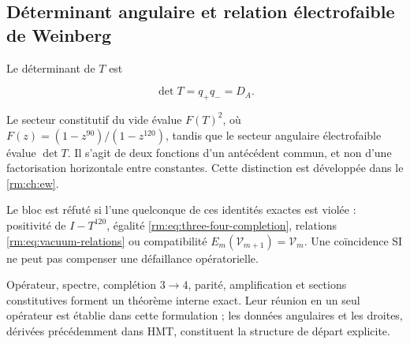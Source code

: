 \subsection{Déterminant angulaire et relation électrofaible de Weinberg}

Le déterminant de \(T\) est

\begin{equation}
\det T=q_+q_-=D_A.
\label{rm:eq:detT}
\end{equation}

Le secteur constitutif du vide évalue \(F(T)^2\), où
\(F(z)=(1-z^{90})/(1-z^{120})\), tandis que le secteur angulaire
électrofaible évalue \(\det T\). Il s'agit de deux fonctions d'un
antécédent commun, et non d'une factorisation horizontale entre constantes.
Cette distinction est développée dans le \cref{rm:ch:ew}.

\begin{falsifier}
Le bloc est réfuté si l'une quelconque de ces identités exactes est violée :
positivité de \(I-T^{120}\), égalité
\cref{rm:eq:three-four-completion}, relations \cref{rm:eq:vacuum-relations} ou
compatibilité \(E_m(\mathcal V_{m+1})=\mathcal V_m\). Une coïncidence SI
ne peut pas compenser une défaillance opératorielle.
\end{falsifier}

\begin{statusbox}
Opérateur, spectre, complétion \(3\to4\), parité, amplification et
sections constitutives forment un théorème interne exact. Leur réunion en un
seul opérateur est établie dans cette formulation ; les données angulaires et
les droites, dérivées précédemment dans HMT, constituent la structure de départ
explicite.
\end{statusbox}
